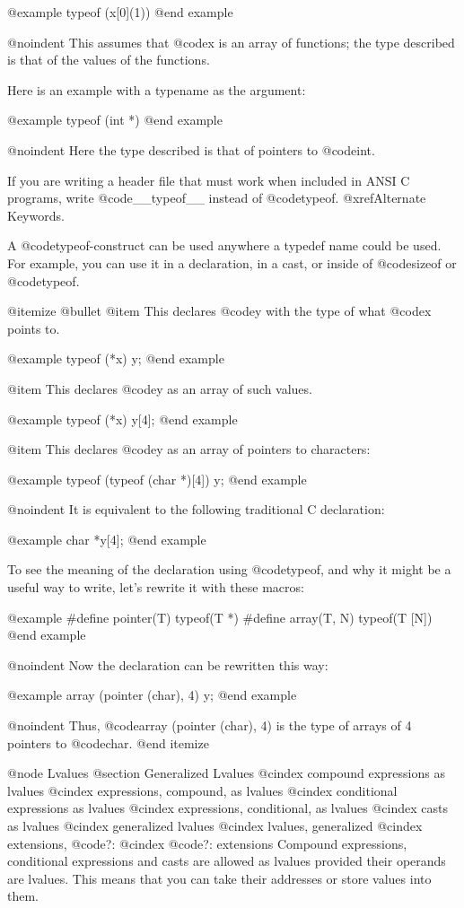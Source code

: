 {@example
typeof (x[0](1))
@end example

@noindent
This assumes that @code{x} is an array of functions; the type described
is that of the values of the functions.

Here is an example with a typename as the argument:

@example
typeof (int *)
@end example

@noindent
Here the type described is that of pointers to @code{int}.

If you are writing a header file that must work when included in ANSI C
programs, write @code{__typeof__} instead of @code{typeof}.
@xref{Alternate Keywords}.

A @code{typeof}-construct can be used anywhere a typedef name could be
used.  For example, you can use it in a declaration, in a cast, or inside
of @code{sizeof} or @code{typeof}.

@itemize @bullet
@item
This declares @code{y} with the type of what @code{x} points to.

@example
typeof (*x) y;
@end example

@item
This declares @code{y} as an array of such values.

@example
typeof (*x) y[4];
@end example

@item
This declares @code{y} as an array of pointers to characters:

@example
typeof (typeof (char *)[4]) y;
@end example

@noindent
It is equivalent to the following traditional C declaration:

@example
char *y[4];
@end example

To see the meaning of the declaration using @code{typeof}, and why it
might be a useful way to write, let's rewrite it with these macros:

@example
#define pointer(T)  typeof(T *)
#define array(T, N) typeof(T [N])
@end example

@noindent
Now the declaration can be rewritten this way:

@example
array (pointer (char), 4) y;
@end example

@noindent
Thus, @code{array (pointer (char), 4)} is the type of arrays of 4
pointers to @code{char}.
@end itemize

@node Lvalues
@section Generalized Lvalues
@cindex compound expressions as lvalues
@cindex expressions, compound, as lvalues
@cindex conditional expressions as lvalues
@cindex expressions, conditional, as lvalues
@cindex casts as lvalues
@cindex generalized lvalues
@cindex lvalues, generalized
@cindex extensions, @code{?:}
@cindex @code{?:} extensions
Compound expressions, conditional expressions and casts are allowed as
lvalues provided their operands are lvalues.  This means that you can take
their addresses or store values into them.

}
